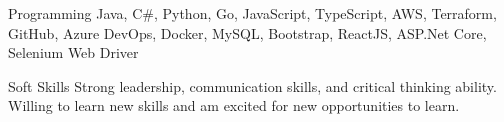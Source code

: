 


\begin{cvskills}


\cvskill
{Programming} %
{Java, C\#, Python, Go, JavaScript, TypeScript, AWS, Terraform, GitHub, Azure DevOps, Docker, MySQL, Bootstrap, ReactJS, ASP.Net Core, Selenium Web Driver} %


\cvskill
{Soft Skills} %
{Strong leadership, communication skills, and critical thinking ability. Willing to learn new skills and am excited for new opportunities to learn.}

\end{cvskills}